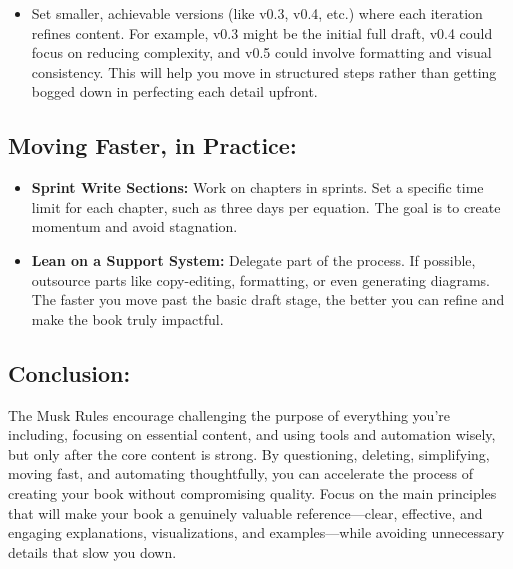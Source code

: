 \documentclass[
  12 pt,
  a4paper,
]{book}
\providecommand{\tightlist}{%
  \setlength{\itemsep}{0pt}\setlength{\parskip}{0pt}}
\numberwithin{equation}{section}
\theoremstyle{plain}      %
\theoremstyle{definition} %
\theoremstyle{remark}     %
\theoremstyle{note}         %
\begin{document}
\begin{enumerate}
  \begin{itemize}
  \tightlist
  \item
    Set smaller, achievable versions (like v0.3, v0.4, etc.) where each
    iteration refines content. For example, v0.3 might be the initial
    full draft, v0.4 could focus on reducing complexity, and v0.5 could
    involve formatting and visual consistency. This will help you move
    in structured steps rather than getting bogged down in perfecting
    each detail upfront.
  \end{itemize}
\end{enumerate}

\hypertarget{moving-faster-in-practice}{%
\subsection*{Moving Faster, in
Practice:}\label{moving-faster-in-practice}}

\begin{itemize}
\tightlist
\item
  \textbf{Sprint Write Sections:} Work on chapters in sprints. Set a
  specific time limit for each chapter, such as three days per equation.
  The goal is to create momentum and avoid stagnation.
\item
  \textbf{Lean on a Support System:} Delegate part of the process. If
  possible, outsource parts like copy-editing, formatting, or even
  generating diagrams. The faster you move past the basic draft stage,
  the better you can refine and make the book truly impactful.
\end{itemize}

\hypertarget{conclusion}{%
\subsection*{Conclusion:}\label{conclusion}}

The Musk Rules encourage challenging the purpose of everything you're
including, focusing on essential content, and using tools and automation
wisely, but only after the core content is strong. By questioning,
deleting, simplifying, moving fast, and automating thoughtfully, you can
accelerate the process of creating your book without compromising
quality. Focus on the main principles that will make your book a
genuinely valuable reference---clear, effective, and engaging
explanations, visualizations, and examples---while avoiding unnecessary
details that slow you down.
\end{document}

